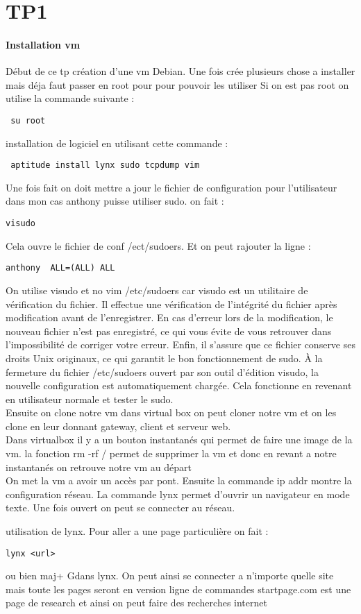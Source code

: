 \documentclass[a4paper,12pt]{article}
\begin{document}
 
\section{TP1}
\paragraph{ Installation vm}
Début de ce tp création d'une vm Debian.
Une fois crée plusieurs chose a installer mais déja faut passer en root pour pour pouvoir les utiliser
Si on est pas root on utilise la commande suivante :
\begin{verbatim}
 su root
\end{verbatim}

installation de logiciel en utilisant cette commande :
\begin{verbatim}
 aptitude install lynx sudo tcpdump vim
\end{verbatim}

Une fois fait on doit mettre a jour le fichier de configuration pour l'utilisateur dans mon cas anthony puisse utiliser sudo.
on fait :
\begin{verbatim}
visudo
\end{verbatim}
Cela ouvre le fichier de conf /ect/sudoers. Et on peut rajouter la ligne : 
\begin{verbatim}
anthony  ALL=(ALL) ALL
\end{verbatim}
On utilise visudo et no vim /etc/sudoers car visudo est un utilitaire de vérification du fichier.
Il effectue une vérification de l'intégrité du fichier après modification avant de l'enregistrer. En cas d'erreur lors de la modification, le nouveau fichier n'est pas enregistré, ce qui vous évite de vous retrouver dans l'impossibilité de corriger votre erreur. Enfin, il s'assure que ce fichier conserve ses droits Unix originaux, ce qui garantit le bon fonctionnement de sudo.
À la fermeture du fichier /etc/sudoers ouvert par son outil d'édition visudo, la nouvelle configuration est automatiquement chargée. 
Cela fonctionne en revenant en utilisateur normale et tester le sudo.\\

Ensuite on clone notre vm dans virtual box on peut cloner notre vm et on les clone en leur donnant
gateway, client et serveur web.\\

Dans virtualbox il y a un bouton instantanés qui permet de faire une image de la vm.
la fonction rm -rf / permet de supprimer la vm et donc en revant a notre instantanés on retrouve notre vm au départ\\


On met la vm a avoir un accès par pont. Ensuite la commande ip addr montre la configuration réseau.
La commande lynx permet d'ouvrir un navigateur en mode texte.
Une fois ouvert on peut se connecter au réseau.
 
utilisation de lynx. Pour aller a une page particulière on fait :
\begin{verbatim}
lynx <url>
\end{verbatim}
 ou bien maj+ Gdans lynx.
On peut ainsi se connecter a n'importe quelle site mais toute les pages seront en version ligne de commandes
startpage.com est une page de research et ainsi on peut faire des recherches internet
\end{document}

